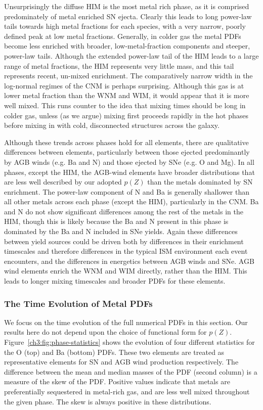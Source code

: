 Unsurprisingly the diffuse HIM is the most metal rich phase, as it is comprised predominately of metal enriched SN ejecta. Clearly this leads to long power-law tails towards high metal fractions for each species, with a very narrow, poorly defined peak at low metal fractions. Generally, in colder gas the metal PDFs become less enriched with broader, low-metal-fraction components and steeper, power-law tails. Although the extended power-law tail of the HIM leads to a large range of metal fractions, the HIM represents very little mass, and this tail represents recent, un-mixed enrichment. The comparatively narrow width in the log-normal regimes of the CNM is perhaps surprising. Although this gas is at lower metal fraction than the WNM and WIM, it would appear that it is more well mixed. This runs counter to the idea that mixing times should be long in colder gas, unless (as we argue) mixing first proceeds rapidly in the hot phases before mixing in with cold, disconnected structures across the galaxy.

Although these trends across phases hold for all elements, there are qualitative differences between elements, particularly between those ejected predominantly by AGB winds (e.g. Ba and N) and those ejected by SNe (e.g. O and Mg). In all phases, except the HIM, the AGB-wind elements have broader distributions that are less well described by our adopted $p(Z)$ than the metals dominated by SN enrichment. The power-law component of N and Ba is generally shallower than all other metals across each phase (except the HIM), particularly in the CNM. Ba and N do not show significant differences among the rest of the metals in the HIM, though this is likely because the Ba and N present in this phase is dominated by the Ba and N included in SNe yields. Again these differences between yield sources could be driven both by differences in their enrichment timescales and therefore differences in the typical ISM environment each event encounters, and the differences in energetics between AGB winds and SNe. AGB wind elements enrich the WNM and WIM directly, rather than the HIM. This leads to longer mixing timescales and broader PDFs for these elements.

\subsubsection{The Time Evolution of Metal PDFs}
\label{ch3:sec:statistics}
We focus on the time evolution of the full numerical PDFs in this section. Our results here do not depend upon the choice of functional form for $p(Z)$. Figure~\ref{ch3:fig:phase-statistics} shows the evolution of four different statistics for the O (top) and Ba (bottom) PDFs. These two elements are treated as representative elements for SN and AGB wind production respectively. The difference between the mean and median masses of the PDF (second column) is a measure of the skew of the PDF. Positive values indicate that metals are preferentially sequestered in metal-rich gas, and are less well mixed throughout the given phase. The skew is always positive in these distributions.


